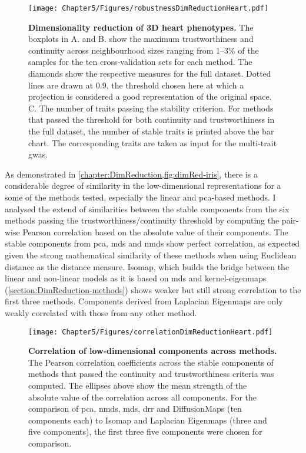 \begin{figure}[h!]
	\centering
	\texttt{[image: Chapter5/Figures/robustnessDimReductionHeart.pdf]}
	\caption[\textbf{Dimensionality reduction of 3D heart phenotypes. }]{\textbf{Dimensionality reduction of 3D heart phenotypes. } The boxplots in A. and B. show the maximum trustworthiness and continuity across neighbourhood sizes ranging from \numrange{1}{3}\% of the samples for the ten cross-validation sets for each method. The diamonds show the respective measures for the full dataset. Dotted lines are drawn at \num{0.9}, the threshold chosen here at which a projection is considered a good representation of the original space. C. The number of traits passing the stability criterion. For methods that passed the threshold for both continuity and trustworthiness in the full dataset, the number of stable traits is printed above the bar chart. The corresponding traits are taken as input for the multi-trait \gls{gwas}.}
	 	\label{fig:dimRed-heart}
\end{figure}
%
As demonstrated in \cref{chapter:DimReduction,fig:dimRed-iris}, there is a considerable degree of similarity in the low-dimensional representations for a some of the methods tested, especially the linear and \gls{pca}-based methods. I analysed the extend of similarities between the stable components from the six methods passing the trustworthiness/continuity threshold by computing the pair-wise Pearson correlation based on the absolute value of their components.  The stable components from \gls{pca}, \gls{mds} and \gls{nmds} show perfect correlation, as expected given the strong mathematical similarity of these methods when using Euclidean distance as the distance measure. Isomap, which builds the bridge between the linear and non-linear models as it is based on \gls{mds} and kernel-eigenmaps (\cref{section:DimReduction-methods}) shows weaker but still strong correlation to the first three methods. Components derived from Laplacian Eigenmaps are only weakly correlated with those from any other method. 
%
\begin{figure}[t]
	\centering
	\texttt{[image: Chapter5/Figures/correlationDimReductionHeart.pdf]}
	\caption[\textbf{Correlation of low-dimensional components across methods. }]{\textbf{Correlation of low-dimensional components across methods. } The Pearson correlation coefficients across the stable components of methods that passed the continuity and trustworthiness criteria was computed. The ellipses above show the mean strength of the absolute value of the correlation across all components. For the comparison of \gls{pca}, \gls{nmds}, \gls{mds}, \gls{drr} and DiffusionMaps (ten components each) to Isomap and Laplacian Eigenmaps (three and five components), the first three five components were chosen for comparison.}
	 	\label{fig:dimRed-correlation}
\end{figure}
